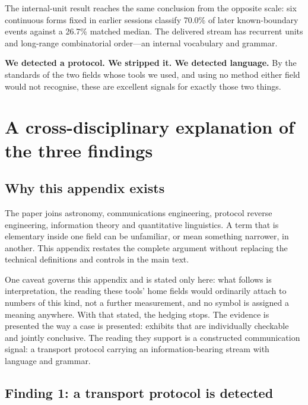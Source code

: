 \documentclass[11pt,a4paper]{article}
\begin{document}
The internal-unit result reaches the same conclusion from the opposite scale: six
continuous forms fixed in earlier sessions classify 70.0\% of later known-boundary
events against a 26.7\% matched median. The delivered stream has recurrent units and
long-range combinatorial order---an internal vocabulary and grammar.

\textbf{We detected a protocol. We stripped it. We detected language.} By the standards
of the two fields whose tools we used, and using no method either field would not
recognise, these are excellent signals for exactly those two things.

\clearpage
\appendix
\section{A cross-disciplinary explanation of the three findings}
\label{app:crossdisciplinary}

\subsection{Why this appendix exists}

The paper joins astronomy, communications engineering, protocol reverse engineering,
information theory and quantitative linguistics. A term that is elementary inside one
field can be unfamiliar, or mean something narrower, in another. This appendix restates
the complete argument without replacing the technical definitions and controls in the
main text.

One caveat governs this appendix and is stated only here: what follows is
interpretation, the reading these tools' home fields would ordinarily attach to
numbers of this kind, not a further measurement, and no symbol is assigned a meaning
anywhere. With that stated, the hedging stops. The evidence is presented the way a
case is presented: exhibits that are individually checkable and jointly conclusive.
The reading they support is a constructed communication signal: a transport protocol
carrying an information-bearing stream with language and grammar.

\subsection{Finding 1: a transport protocol is detected}
\end{document}

